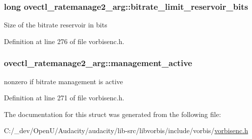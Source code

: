 \subsubsection[{\texorpdfstring{bitrate\+\_\+limit\+\_\+reservoir\+\_\+bits}{bitrate_limit_reservoir_bits}}]{\setlength{\rightskip}{0pt plus 5cm}long ovectl\+\_\+ratemanage2\+\_\+arg\+::bitrate\+\_\+limit\+\_\+reservoir\+\_\+bits}\hypertarget{structovectl__ratemanage2__arg_a75e496acac882e156137de9d1200ebd7}{}\label{structovectl__ratemanage2__arg_a75e496acac882e156137de9d1200ebd7}
Size of the bitrate reservoir in bits 

Definition at line 276 of file vorbisenc.\+h.

\subsubsection[{\texorpdfstring{management\+\_\+active}{management_active}}]{ ovectl\+\_\+ratemanage2\+\_\+arg\+::management\+\_\+active}\hypertarget{structovectl__ratemanage2__arg_aca1f656373a1597177dac924578e375b}{}\label{structovectl__ratemanage2__arg_aca1f656373a1597177dac924578e375b}
nonzero if bitrate management is active 

Definition at line 271 of file vorbisenc.\+h.



The documentation for this struct was generated from the following file\+:\begin{DoxyCompactItemize}
\item 
C\+:/\+\_\+dev/\+Open\+U/\+Audacity/audacity/lib-\/src/libvorbis/include/vorbis/\hyperlink{vorbisenc_8h}{vorbisenc.\+h}\end{DoxyCompactItemize}
